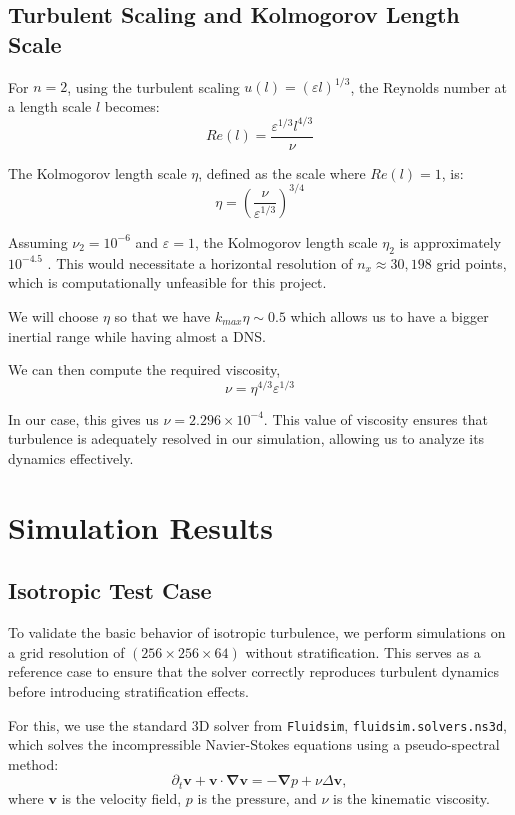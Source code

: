 \documentclass[final,5p,times,twocolumn,authoryear]{elsarticle}
\begin{document}
\subsection{Turbulent Scaling and Kolmogorov Length Scale}

For $n = 2$, using the turbulent scaling  $u(l) = (\varepsilon l)^{1/3}$, the Reynolds number at a length scale $l$ becomes:
\begin{equation*}
Re(l) = \frac{\varepsilon^{1/3} l^{4/3}}{\nu}
\end{equation*}

The Kolmogorov length scale $\eta$, defined as the scale where  $Re(l) = 1$, is:
\begin{equation*}
\eta = \left(\frac{\nu}{\varepsilon^{1/3}}\right)^{3/4}
\end{equation*}

Assuming  $\nu_2 = 10^{-6}$ and $\varepsilon = 1$, the Kolmogorov length scale  $\eta_2$  is approximately  $10^{-4.5}$ . This would necessitate a horizontal resolution of  $n_x \approx 30,198$  grid points, which is computationally unfeasible for this project.

We will choose $\eta$ so that we have $k_{max} \eta \sim 0.5$ which allows us to have a bigger inertial range while having almost a DNS.

We can then compute the required viscosity,
\begin{equation*}
\nu = \eta^{4/3} \varepsilon^{1/3}
\end{equation*}

In our case, this gives us $\nu = 2.296 \times 10^{-4}$. This value of viscosity ensures that turbulence is adequately resolved in our simulation, allowing us to analyze its dynamics effectively.

\section{Simulation Results}
\subsection{Isotropic Test Case}

To validate the basic behavior of isotropic turbulence, we perform simulations on a grid resolution of $(256 \times 256 \times 64)$ without stratification. This serves as a reference case to ensure that the solver correctly reproduces turbulent dynamics before introducing stratification effects.

For this, we use the standard 3D solver from \texttt{Fluidsim}, \texttt{fluidsim.solvers.ns3d}, which solves the incompressible Navier-Stokes equations using a pseudo-spectral method:
\begin{equation*}
\partial_t \textbf{v} + \textbf{v} \cdot \boldsymbol{\nabla} \textbf{v} =
- \boldsymbol{\nabla} p  + \nu \Delta \textbf{v},
\end{equation*}
where $\textbf{v}$ is the velocity field, $p$ is the pressure, and $\nu$ is the kinematic viscosity.
\end{document}
